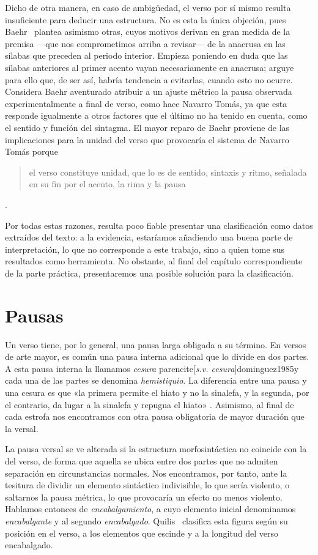 Dicho de otra manera, en caso de ambigüedad, el verso por sí mismo resulta insuficiente para deducir una estructura. No es esta la única objeción, pues Baehr~\parencite*[29-30]{baehr1997} plantea asimismo otras, cuyos motivos derivan en gran medida de la premisa —que nos comprometimos arriba a revisar— de la anacrusa en las sílabas que preceden al periodo interior. Empieza poniendo en duda que las sílabas anteriores al primer acento vayan necesariamente en anacrusa; arguye para ello que, de ser así, habría tendencia a evitarlas, cuando esto no ocurre. Considera Baehr aventurado atribuir a un ajuste métrico la pausa observada experimentalmente a final de verso, como hace Navarro Tomás, ya que esta responde igualmente a otros factores que el último no ha tenido en cuenta, como el sentido y función del sintagma. El mayor reparo de Baehr proviene de las implicaciones para la unidad del verso que provocaría el sistema de Navarro Tomás porque \blockquote{el verso constituye unidad, que lo es de sentido, sintaxis y ritmo, señalada en su fin por el acento, la rima y la pausa} \parencite[29]{baehr1997}.

Por todas estas razones, resulta poco fiable presentar una clasificación como datos extraídos del texto: a la evidencia, estaríamos añadiendo una buena parte de interpretación, lo que no corresponde a este trabajo, sino a quien tome sus resultados como herramienta. No obstante, al final del capítulo correspondiente de la parte práctica, presentaremos una posible solución para la clasificación.


\section{Pausas}
Un verso tiene, por lo general, una pausa larga obligada a su término. En versos de arte mayor, es común una pausa interna adicional que lo divide en dos partes.  A esta pausa interna la llamamos \textit{cesura} parencite[\textit{s.v. cesura}]{dominguez1985}y cada una de las partes se denomina \textit{hemistiquio}. La diferencia entre una pausa y una cesura \parencite[\textit{s.v. hemistiquio}]{dominguez1985} es que «la primera permite el hiato y no la sinalefa, y la segunda, por el contrario, da lugar a la sinalefa y repugna el hiato» \parencite[151]{bello1981}. Asimismo, al final de cada estrofa nos encontramos con otra pausa obligatoria de mayor duración que la versal. 

La pausa versal se ve alterada si la estructura morfosintáctica no coincide con la del verso, de forma que aquella se ubica entre dos partes que no admiten separación en circunstancias normales. Nos encontramos, por tanto, ante la tesitura de dividir un elemento sintáctico indivisible, lo que sería violento, o saltarnos la pausa métrica, lo que provocaría un efecto no menos violento. Hablamos entonces de \textit{encabalgamiento}, a cuyo elemento inicial denominamos \textit{encabalgante} y al segundo \textit{encabalgado}. Quilis~\parencite*[81-92]{quilis2013} clasifica esta figura según su posición en el verso, a los elementos que escinde y a la longitud del verso encabalgado.

